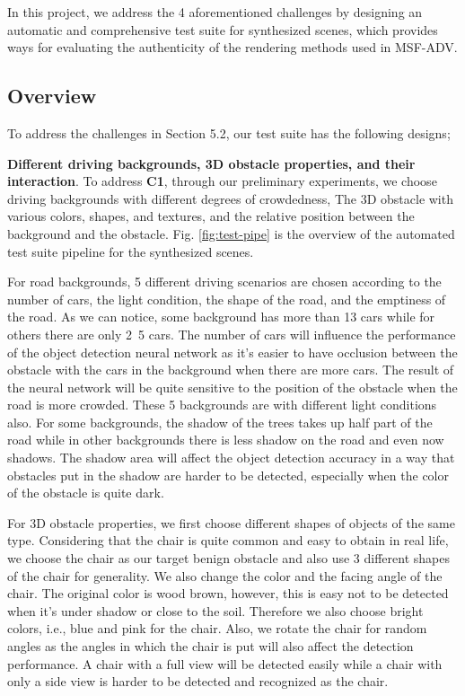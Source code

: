 In this project, we address the 4 aforementioned challenges by designing an automatic and comprehensive test suite for synthesized scenes,
which provides ways for evaluating the authenticity of the rendering methods used in MSF-ADV\cite{msf-adv}.

\subsection{Overview}

To address the challenges in Section 5.2, our test suite has the following designs;

\textbf{Different driving backgrounds, 3D obstacle properties, and their interaction}. 
To address \textbf{C1}, through our preliminary experiments, we choose driving backgrounds with different degrees of crowdedness, 
The 3D obstacle with various colors, shapes, and textures, and the relative position between the background and the obstacle.
Fig. \ref{fig:test-pipe} is the overview of the automated test suite pipeline for the synthesized scenes.

For road backgrounds, 5 different driving scenarios are chosen according to the number of cars, the light condition, the shape of the road, and the emptiness of the road.
As we can notice, some background has more than 13 cars while for others there are only 2~5 cars.
The number of cars will influence the performance of the object detection neural network as it's easier to have occlusion between the obstacle with the cars in the background when there are more cars.
The result of the neural network will be quite sensitive to the position of the obstacle when the road is more crowded.
These 5 backgrounds are with different light conditions also. 
For some backgrounds, the shadow of the trees takes up half part of the road while in other backgrounds there is less shadow on the road and even now shadows.
The shadow area will affect the object detection accuracy in a way that obstacles put in the shadow are harder to be detected, 
especially when the color of the obstacle is quite dark.

For 3D obstacle properties, we first choose different shapes of objects of the same type.
Considering that the chair is quite common and easy to obtain in real life, 
we choose the chair as our target benign obstacle and also use 3 different shapes of the chair for generality.
We also change the color and the facing angle of the chair.
The original color is wood brown, however, this is easy not to be detected when it's under shadow or close to the soil.
Therefore we also choose bright colors, i.e., blue and pink for the chair.
Also, we rotate the chair for random angles as the angles in which the chair is put will also affect the detection performance.
A chair with a full view will be detected easily while a chair with only a side view is harder to be detected and recognized as the chair.

